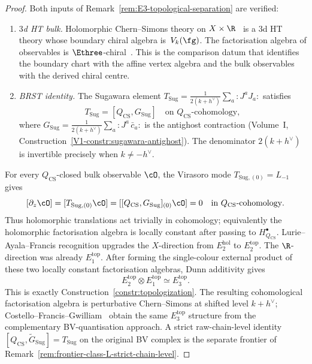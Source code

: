 \begin{proof}
Both inputs of
Remark~\ref{rem:E3-topological-separation} are verified:
\begin{enumerate}[label=\textup{(\alph*)}]
\item \emph{$3$d HT bulk.}
 Holomorphic Chern--Simons theory on
 $X \times \R$~\cite{CL16} is a $3$d HT theory
 whose boundary chiral algebra is~$V_k(\fg)$.
 The factorisation algebra of observables is
 $\Ethree$-chiral~\cite{CFG26}.  This is the comparison datum
 that identifies the boundary chart with the affine vertex algebra
 and the bulk observables with the derived chiral centre.
\item \emph{BRST identity.}
 The Sugawara element
 $T_{\mathrm{Sug}} = \frac{1}{2(k+h^\vee)}\sum_a {:}J^a J_a{:}$
 satisfies
 \[
 T_{\mathrm{Sug}}=[Q_{\mathrm{CS}},G_{\mathrm{Sug}}]
 \quad\text{on }Q_{\mathrm{CS}}\text{-cohomology},
 \]
 where
 $G_{\mathrm{Sug}} = \frac{1}{2(k+h^\vee)}\sum_a {:}J^a\,
 \bar c_a{:}$ is the antighost contraction
 \textup{(}Volume~I,
 Construction~\textup{\ref*{V1-constr:sugawara-antighost}}\textup{)}.
 The denominator $2(k + h^\vee)$ is invertible precisely when
 $k \ne -h^\vee$.
\end{enumerate}
For every \(Q_{\mathrm{CS}}\)-closed bulk observable \(\cO\), the
Virasoro mode \(T_{\mathrm{Sug},(0)}=L_{-1}\) gives
\[
[\partial_z\cO]
= [T_{\mathrm{Sug},(0)}\cO]
= [[Q_{\mathrm{CS}},G_{\mathrm{Sug}}]_{(0)}\cO]
=0
\quad\text{in }Q_{\mathrm{CS}}\text{-cohomology}.
\]
Thus holomorphic translations act trivially in cohomology; equivalently
the holomorphic factorisation algebra is locally constant after
passing to \(H^\bullet_{Q_{\mathrm{CS}}}\).  Lurie--Ayala--Francis
recognition upgrades the \(X\)-direction from \(E_2^{\mathrm{hol}}\)
to \(E_2^{\mathrm{top}}\).  The \(\R\)-direction was already
\(E_1^{\mathrm{top}}\).  After forming the single-colour external
product of these two locally constant factorisation algebras,
Dunn additivity gives
\[
E_2^{\mathrm{top}}\otimes E_1^{\mathrm{top}}
\simeq E_3^{\mathrm{top}}.
\]
This is exactly Construction~\ref{constr:topologization}.  The
resulting cohomological factorisation algebra is perturbative
Chern--Simons at shifted level \(k+h^\vee\); Costello--Francis--Gwilliam~\cite{CFG26}
obtain the same \(E_3^{\mathrm{top}}\)
structure from the complementary BV-quantisation approach.  A strict
raw-chain-level identity
\([Q_{\mathrm{CS}},\widetilde G_{\mathrm{Sug}}]=T_{\mathrm{Sug}}\)
on the original BV complex is the separate frontier of
Remark~\ref{rem:frontier-class-L-strict-chain-level}.
\end{proof}

